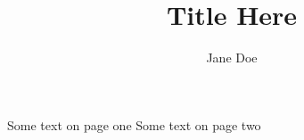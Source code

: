 \documentclass{slides}
\title{Title Here}
\author{Jane Doe}
\begin{document}
\maketitle

Some text on page one
\newpage
Some text on page two
\end{document}
